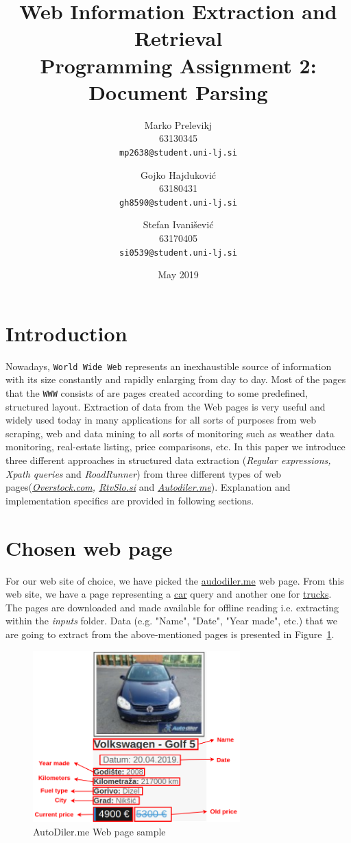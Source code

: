 \documentclass{article}
\title{
	Web Information Extraction and Retrieval\\
	Programming Assignment 2: \\
	Document Parsing
}
\author{
	Marko Prelevikj\\
	63130345\\
	\texttt{mp2638@student.uni-lj.si}
	\and
	Gojko Hajduković\\
	63180431\\
	\texttt{gh8590@student.uni-lj.si}
	\and
	Stefan Ivanišević\\
	63170405\\
	\texttt{si0539@student.uni-lj.si}
}
\date{May 2019}
\begin{document}
	
	\maketitle
	
	\section{Introduction}
	Nowadays, \texttt{World Wide Web} represents an inexhaustible source of information with its size constantly and rapidly enlarging from day to day. Most of the pages that the \texttt{WWW} consists of are pages created according to some predefined, structured layout. Extraction of data from the Web pages is very useful and widely used today in many applications for all sorts of purposes from web scraping, web and data mining to all sorts of monitoring such as weather data monitoring, real-estate listing, price comparisons, etc. In this paper we introduce three different approaches in structured data extraction (\textit{Regular expressions, Xpath queries} and \textit{RoadRunner}) from three different types of web pages(\textit{\href{https://www.overstock.com/}{Overstock.com}, \href{https://www.rtvslo.si/}{RtvSlo.si}} and \textit{\href{http://www.autodiler.me}{Autodiler.me}}). Explanation and implementation specifics are provided in following sections.\footnotemark
	
	\section{Chosen web page}
	For our web site of choice, we have picked the \href{http://www.autodiler.me}{audodiler.me} web page. From this web site, we have a page representing a  \href{http://www.autodiler.me/auto_oglasi_auto}{car} query and another one for \href{http://www.autodiler.me/auto_oglasi_kamion}{trucks}. The pages are  downloaded and made available for offline reading i.e. extracting within the \textit{inputs} folder. Data (e.g. "Name", "Date", "Year made", etc.) that we are going to extract from the above-mentioned pages is presented in Figure~\ref{fig:adiler}.
	
	\begin{figure}[H]
		\centering
		\includegraphics[width=8cm]{adiler.png}
		\caption{AutoDiler.me Web page sample}
		\label{fig:adiler}
	\end{figure}
	
\end{document}
